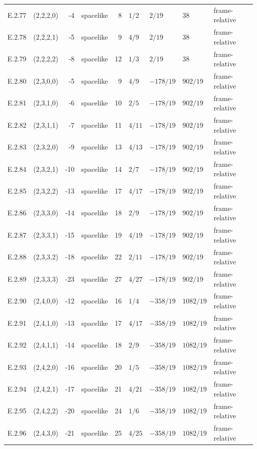 {\begin{longtable}{@{}llrlrllll@{}}
E.2.77 & (2,2,2,0) & -4 & spacelike & 8 & $1/2$ & $2/19$ & $38$ & frame-relative \\
E.2.78 & (2,2,2,1) & -5 & spacelike & 9 & $4/9$ & $2/19$ & $38$ & frame-relative \\
E.2.79 & (2,2,2,2) & -8 & spacelike & 12 & $1/3$ & $2/19$ & $38$ & frame-relative \\
E.2.80 & (2,3,0,0) & -5 & spacelike & 9 & $4/9$ & $-178/19$ & $902/19$ & frame-relative \\
E.2.81 & (2,3,1,0) & -6 & spacelike & 10 & $2/5$ & $-178/19$ & $902/19$ & frame-relative \\
E.2.82 & (2,3,1,1) & -7 & spacelike & 11 & $4/11$ & $-178/19$ & $902/19$ & frame-relative \\
E.2.83 & (2,3,2,0) & -9 & spacelike & 13 & $4/13$ & $-178/19$ & $902/19$ & frame-relative \\
E.2.84 & (2,3,2,1) & -10 & spacelike & 14 & $2/7$ & $-178/19$ & $902/19$ & frame-relative \\
E.2.85 & (2,3,2,2) & -13 & spacelike & 17 & $4/17$ & $-178/19$ & $902/19$ & frame-relative \\
E.2.86 & (2,3,3,0) & -14 & spacelike & 18 & $2/9$ & $-178/19$ & $902/19$ & frame-relative \\
E.2.87 & (2,3,3,1) & -15 & spacelike & 19 & $4/19$ & $-178/19$ & $902/19$ & frame-relative \\
E.2.88 & (2,3,3,2) & -18 & spacelike & 22 & $2/11$ & $-178/19$ & $902/19$ & frame-relative \\
E.2.89 & (2,3,3,3) & -23 & spacelike & 27 & $4/27$ & $-178/19$ & $902/19$ & frame-relative \\
E.2.90 & (2,4,0,0) & -12 & spacelike & 16 & $1/4$ & $-358/19$ & $1082/19$ & frame-relative \\
E.2.91 & (2,4,1,0) & -13 & spacelike & 17 & $4/17$ & $-358/19$ & $1082/19$ & frame-relative \\
E.2.92 & (2,4,1,1) & -14 & spacelike & 18 & $2/9$ & $-358/19$ & $1082/19$ & frame-relative \\
E.2.93 & (2,4,2,0) & -16 & spacelike & 20 & $1/5$ & $-358/19$ & $1082/19$ & frame-relative \\
E.2.94 & (2,4,2,1) & -17 & spacelike & 21 & $4/21$ & $-358/19$ & $1082/19$ & frame-relative \\
E.2.95 & (2,4,2,2) & -20 & spacelike & 24 & $1/6$ & $-358/19$ & $1082/19$ & frame-relative \\
E.2.96 & (2,4,3,0) & -21 & spacelike & 25 & $4/25$ & $-358/19$ & $1082/19$ & frame-relative \\

\end{longtable}}
